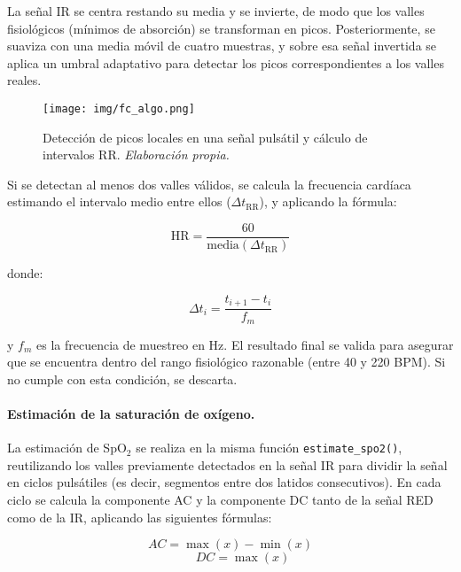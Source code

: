 La señal IR se centra restando su media y se invierte, de modo que los valles fisiológicos (mínimos de absorción) se transforman en picos. Posteriormente, se suaviza con una media móvil de cuatro muestras, y sobre esa señal invertida se aplica un umbral adaptativo para detectar los picos correspondientes a los valles reales.

\begin{figure}[H]
    \centering
    \texttt{[image: img/fc\_algo.png]}
    \caption{Detección de picos locales en una señal pulsátil y cálculo de intervalos RR. \textit{Elaboración propia.}}
    \label{fig:enter-label}
\end{figure}

Si se detectan al menos dos valles válidos, se calcula la frecuencia cardíaca estimando el intervalo medio entre ellos ($\Delta t_{\text{RR}}$), y aplicando la fórmula:

\begin{equation}
\text{HR} = \frac{60}{\text{media}(\Delta t_{\text{RR}})}
\end{equation}

donde:

\begin{equation}
\Delta t_i = \frac{t_{i+1} - t_i}{f_m}
\end{equation}

y $f_m$ es la frecuencia de muestreo en Hz. El resultado final se valida para asegurar que se encuentra dentro del rango fisiológico razonable (entre 40 y 220 BPM). Si no cumple con esta condición, se descarta.


\paragraph{Estimación de la saturación de oxígeno.}

La estimación de SpO$_2$ se realiza en la misma función \texttt{estimate\_spo2()}, reutilizando los valles previamente detectados en la señal IR para dividir la señal en ciclos pulsátiles (es decir, segmentos entre dos latidos consecutivos). En cada ciclo se calcula la componente AC y la componente DC tanto de la señal RED como de la IR, aplicando las siguientes fórmulas:

\begin{equation}
AC = \max(x) - \min(x)\end{equation}\begin{equation} \qquad DC = \max(x)
\end{equation}

